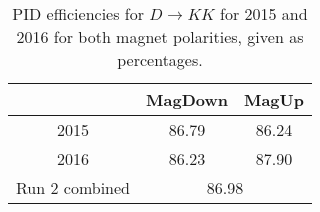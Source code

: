 \documentclass{article}
\begin{document}
\begin{table}[H]
    \centering
    \begin{tabular}{ccc}
        \toprule
        & MagDown & MagUp \\
        \midrule
        2015 & 86.79 & 86.24 \\
        2016 & 86.23 & 87.90 \\
        \midrule
        Run 2 combined & \multicolumn{2}{c}{86.98} \\
        \bottomrule
    \end{tabular}
    \caption{PID efficiencies for $D \to KK$ for 2015 and 2016 for both magnet polarities, given as percentages.}
\label{tab:PID_efficiency_KK}
\end{table}
\end{document}
